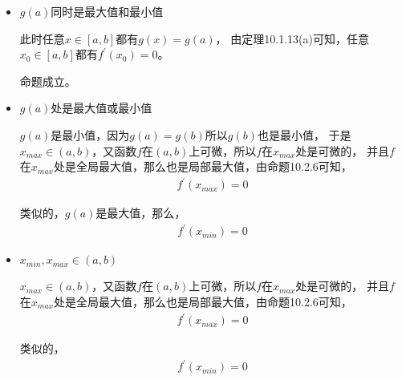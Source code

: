 \documentclass{article}
\begin{document}
\begin{itemize}
  \item $g(a)$同时是最大值和最小值

        此时任意$x \in [a, b]$都有$g(x) = g(a)$，
        由定理10.1.13(a)可知，任意$x_0 \in [a, b]$都有$f^\prime(x_0) = 0$。

        命题成立。

  \item $g(a)$处是最大值或最小值

        $g(a)$是最小值，因为$g(a) = g(b)$所以$g(b)$也是最小值，
        于是$x_{max} \in (a, b)$，又函数$f$在$(a, b)$上可微，所以$f$在$x_{max}$处是可微的，
        并且$f$在$x_{max}$处是全局最大值，那么也是局部最大值，由命题10.2.6可知，
        \begin{align*}
          f^\prime(x_{max}) = 0
        \end{align*}

        类似的，$g(a)$是最大值，那么，
        \begin{align*}
          f^\prime(x_{min}) = 0
        \end{align*}

  \item $x_{min}, x_{max} \in (a, b)$

        $x_{max} \in (a, b)$，又函数$f$在$(a, b)$上可微，所以$f$在$x_{max}$处是可微的，
        并且$f$在$x_{max}$处是全局最大值，那么也是局部最大值，由命题10.2.6可知，
        \begin{align*}
          f^\prime(x_{max}) = 0
        \end{align*}

        类似的，
        \begin{align*}
          f^\prime(x_{min}) = 0
        \end{align*}

\end{itemize}
\end{document}
